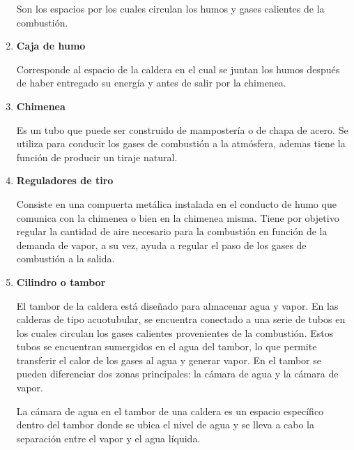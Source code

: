 \begin{enumerate}
	Son los espacios por los cuales circulan los humos y gases calientes de la combustión.
	
	\item \textbf{Caja de humo}
	
	Corresponde al espacio de la caldera en el cual se juntan los humos después de haber entregado su energía y antes de salir por la chimenea.
	
	\item \textbf{Chimenea}
	 
	Es un tubo que puede ser construido de mampostería o de chapa de acero. Se utiliza para conducir los gases de combustión a la atmósfera, ademas tiene la función de producir un tiraje natural.
	
	\item \textbf{Reguladores de tiro}
	
	Consiste en una compuerta metálica instalada en el conducto de humo que comunica con la chimenea o bien en la chimenea misma. Tiene por objetivo regular la cantidad de aire necesario para la combustión en función de la demanda de vapor, a su vez, ayuda a regular el paso de los gases de combustión a la salida.
	
	\item \textbf{Cilindro o tambor}
	
	El tambor de la caldera está diseñado para almacenar agua y vapor. En las calderas de tipo acuotubular, se encuentra conectado a una serie de tubos en los cuales circulan los gases calientes provenientes de la combustión. Estos tubos se encuentran sumergidos en el agua del tambor, lo que permite transferir el calor de los gases al agua y generar vapor.
	En el tambor se pueden diferenciar dos zonas principales: la cámara de agua y la cámara de vapor.
	
	La cámara de agua en el tambor de una caldera es un espacio específico dentro del tambor donde se ubica el nivel de agua y se lleva a cabo la separación entre el vapor y el agua líquida.
	
\end{enumerate}   
